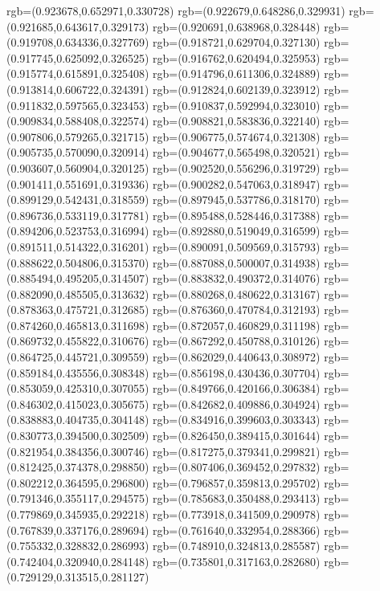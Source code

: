 {{{			rgb=(0.923678,0.652971,0.330728)
			rgb=(0.922679,0.648286,0.329931)
			rgb=(0.921685,0.643617,0.329173)
			rgb=(0.920691,0.638968,0.328448)
			rgb=(0.919708,0.634336,0.327769)
			rgb=(0.918721,0.629704,0.327130)
			rgb=(0.917745,0.625092,0.326525)
			rgb=(0.916762,0.620494,0.325953)
			rgb=(0.915774,0.615891,0.325408)
			rgb=(0.914796,0.611306,0.324889)
			rgb=(0.913814,0.606722,0.324391)
			rgb=(0.912824,0.602139,0.323912)
			rgb=(0.911832,0.597565,0.323453)
			rgb=(0.910837,0.592994,0.323010)
			rgb=(0.909834,0.588408,0.322574)
			rgb=(0.908821,0.583836,0.322140)
			rgb=(0.907806,0.579265,0.321715)
			rgb=(0.906775,0.574674,0.321308)
			rgb=(0.905735,0.570090,0.320914)
			rgb=(0.904677,0.565498,0.320521)
			rgb=(0.903607,0.560904,0.320125)
			rgb=(0.902520,0.556296,0.319729)
			rgb=(0.901411,0.551691,0.319336)
			rgb=(0.900282,0.547063,0.318947)
			rgb=(0.899129,0.542431,0.318559)
			rgb=(0.897945,0.537786,0.318170)
			rgb=(0.896736,0.533119,0.317781)
			rgb=(0.895488,0.528446,0.317388)
			rgb=(0.894206,0.523753,0.316994)
			rgb=(0.892880,0.519049,0.316599)
			rgb=(0.891511,0.514322,0.316201)
			rgb=(0.890091,0.509569,0.315793)
			rgb=(0.888622,0.504806,0.315370)
			rgb=(0.887088,0.500007,0.314938)
			rgb=(0.885494,0.495205,0.314507)
			rgb=(0.883832,0.490372,0.314076)
			rgb=(0.882090,0.485505,0.313632)
			rgb=(0.880268,0.480622,0.313167)
			rgb=(0.878363,0.475721,0.312685)
			rgb=(0.876360,0.470784,0.312193)
			rgb=(0.874260,0.465813,0.311698)
			rgb=(0.872057,0.460829,0.311198)
			rgb=(0.869732,0.455822,0.310676)
			rgb=(0.867292,0.450788,0.310126)
			rgb=(0.864725,0.445721,0.309559)
			rgb=(0.862029,0.440643,0.308972)
			rgb=(0.859184,0.435556,0.308348)
			rgb=(0.856198,0.430436,0.307704)
			rgb=(0.853059,0.425310,0.307055)
			rgb=(0.849766,0.420166,0.306384)
			rgb=(0.846302,0.415023,0.305675)
			rgb=(0.842682,0.409886,0.304924)
			rgb=(0.838883,0.404735,0.304148)
			rgb=(0.834916,0.399603,0.303343)
			rgb=(0.830773,0.394500,0.302509)
			rgb=(0.826450,0.389415,0.301644)
			rgb=(0.821954,0.384356,0.300746)
			rgb=(0.817275,0.379341,0.299821)
			rgb=(0.812425,0.374378,0.298850)
			rgb=(0.807406,0.369452,0.297832)
			rgb=(0.802212,0.364595,0.296800)
			rgb=(0.796857,0.359813,0.295702)
			rgb=(0.791346,0.355117,0.294575)
			rgb=(0.785683,0.350488,0.293413)
			rgb=(0.779869,0.345935,0.292218)
			rgb=(0.773918,0.341509,0.290978)
			rgb=(0.767839,0.337176,0.289694)
			rgb=(0.761640,0.332954,0.288366)
			rgb=(0.755332,0.328832,0.286993)
			rgb=(0.748910,0.324813,0.285587)
			rgb=(0.742404,0.320940,0.284148)
			rgb=(0.735801,0.317163,0.282680)
			rgb=(0.729129,0.313515,0.281127)
}}}

